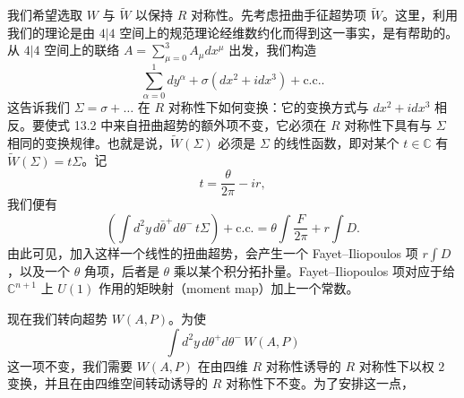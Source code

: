 我们希望选取 $W$ 与 $\widetilde W$ 以保持 $R$ 对称性。先考虑扭曲手征超势项 $\widetilde W$。这里，利用我们的理论是由 $4|4$ 空间上的规范理论经维数约化而得到这一事实，是有帮助的。从 $4|4$ 空间上的联络 $A=\sum_{\mu=0}^{3}A_\mu dx^\mu$ 出发，我们构造
\[
\sum_{\alpha=0}^{1}dy^\alpha+\sigma(dx^2+idx^3)+\text{c.c.}.
\]
这告诉我们 $\Sigma=\sigma+\dots$ 在 $R$ 对称性下如何变换：它的变换方式与 $dx^2+idx^3$ 相反。要使式 13.2 中来自扭曲超势的额外项不变，它必须在 $R$ 对称性下具有与 $\Sigma$ 相同的变换规律。也就是说，$\widetilde W(\Sigma)$ 必须是 $\Sigma$ 的线性函数，即对某个 $t\in\mathbb{C}$ 有 $\widetilde W(\Sigma)=t\Sigma$。记
\[
t=\frac{\theta}{2\pi}-ir,
\]
我们便有
\[
\left(\int d^2y\,d\bar\theta^+d\theta^-\,t\Sigma\right)+\text{c.c.}=\theta\int\frac{F}{2\pi}+r\int D.
\]
由此可见，加入这样一个线性的扭曲超势，会产生一个 Fayet--Iliopoulos 项 $r\int D$，以及一个 $\theta$ 角项，后者是 $\theta$ 乘以某个积分拓扑量。Fayet--Iliopoulos 项对应于给 $\mathbb{C}^{n+1}$ 上 $U(1)$ 作用的矩映射（moment map）加上一个常数。

现在我们转向超势 $W(A,P)$。为使
\[
\int d^2y\,d\theta^+d\theta^-\,W(A,P)
\]
这一项不变，我们需要 $W(A,P)$ 在由四维 $R$ 对称性诱导的 $R$ 对称性下以权 $2$ 变换，并且在由四维空间转动诱导的 $R$ 对称性下不变。为了安排这一点，

